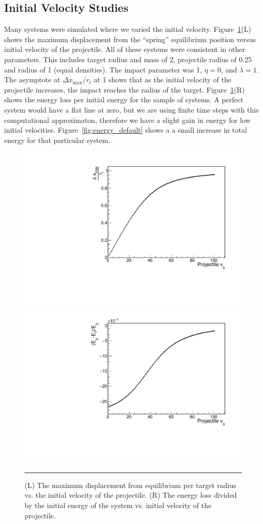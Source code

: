 \documentclass[aps,prl,floatfix,preprint,nofootinbib]{revtex4}
\begin{document}
\subsection{Initial Velocity Studies}
Many systems were simulated where we varied the initial velocity. Figure~\ref{fig:changing_pvinit1}(L) shows the maximum displacement from the ``spring'' equilibrium position versus initial velocity of the projectile. All of these systems were consistent in other parameters. This includes target radius and mass of 2, projectile radius of 0.25 and radius of 1 (equal densities). The impact parameter was 1, $\eta = 0$, and $\lambda = 1$. The asymptote at $\Delta x_{\text{max}}/r_t$ at 1 shows that as the initial velocity of the projectile increases, the impact reaches the radius of the target. Figure~\ref{fig:changing_pvinit1}(R) shows the energy loss per initial energy for the sample of systems. A perfect system would have a flat line at zero, but we are using finite time steps with this computational approximaton, therefore we have a slight gain in energy for low initial velocities. Figure~\ref{fig:energy_default} shows a a small increase in total energy for that particular system.
\begin{figure}[h!]
  \includegraphics[width=.45\linewidth]{plots/trend_plots/dxmax_vs_pvinit.pdf}
  \includegraphics[width=.45\linewidth]{plots/trend_plots/Eloss_vs_pvinit.pdf}
                  {\par\nobreak\rule[9pt]{35em}{0.5pt}\vspace{-5mm}}
                  \caption{(L) The maximum displacement from equilibrium per target radius vs. the initial velocity of the projectile. (R) The energy loss divided by the initial energy of the system vs. initial velocity of the projectile.}
                  \label{fig:changing_pvinit1}
\end{figure}
\end{document}
